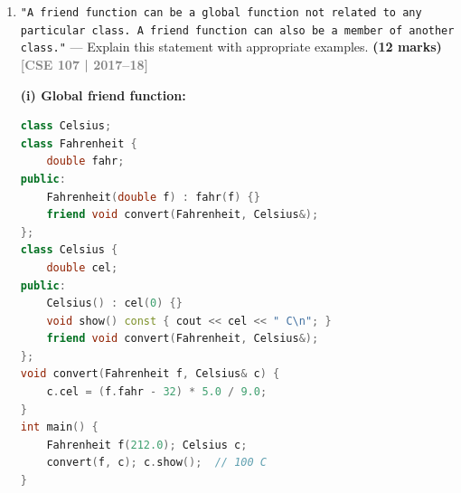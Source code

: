 \documentclass[12pt,a3paper]{article}
\newcommand{\yr}[1]{\hfill\textcolor{gray}{\small\textbf{[#1]}}}
\newcommand{\mk}[1]{\textcolor{orange!70!black}{\small\textbf{(#1 marks)}}}
\begin{document}
\begin{enumerate}
\begin{tcolorbox}
\begin{lstlisting}[language=C++]
#include <iostream>
using namespace std;

class Node;   // forward declaration

class LinkedList {
    Node* head;   // pointer to incomplete type is valid
public:
    LinkedList();
    void push(int val);
    void display() const;
};

class Node {
    int data;
    Node* next;
public:
    Node(int d) : data(d), next(nullptr) {}
    friend class LinkedList;
};

LinkedList::LinkedList() : head(nullptr) {}

void LinkedList::push(int val) {
    Node* n = new Node(val);
    n->next = head; head = n;
}

void LinkedList::display() const {
    Node* cur = head;
    while (cur) { cout << cur->data << " -> "; cur = cur->next; }
    cout << "NULL\n";
}

int main() {
    LinkedList list;
    list.push(30); list.push(20); list.push(10);
    list.display();   // 10 -> 20 -> 30 -> NULL
    return 0;
}
\end{lstlisting}

\end{tcolorbox}


\item \texttt{"A friend function can be a global function not related to any particular class. A friend function can also be a member of another class."} --- Explain this statement with appropriate examples. \mk{12}
\yr{CSE 107 | 2017--18}


\begin{tcolorbox}[enhanced,breakable,ansbox,colback=cD!4,colframe=cD,
  boxrule=0.8pt,arc=5pt,
  title={\textbf{Answer --- Friend as global and as member of another class}},
  fonttitle=\bfseries\color{white},colbacktitle=cD]

\textbf{(i) Global friend function:}
\begin{lstlisting}[language=C++]
class Celsius;
class Fahrenheit {
    double fahr;
public:
    Fahrenheit(double f) : fahr(f) {}
    friend void convert(Fahrenheit, Celsius&);
};
class Celsius {
    double cel;
public:
    Celsius() : cel(0) {}
    void show() const { cout << cel << " C\n"; }
    friend void convert(Fahrenheit, Celsius&);
};
void convert(Fahrenheit f, Celsius& c) {
    c.cel = (f.fahr - 32) * 5.0 / 9.0;
}
int main() {
    Fahrenheit f(212.0); Celsius c;
    convert(f, c); c.show();  // 100 C
}
\end{lstlisting}


\end{tcolorbox}
\end{enumerate}
\end{document}
